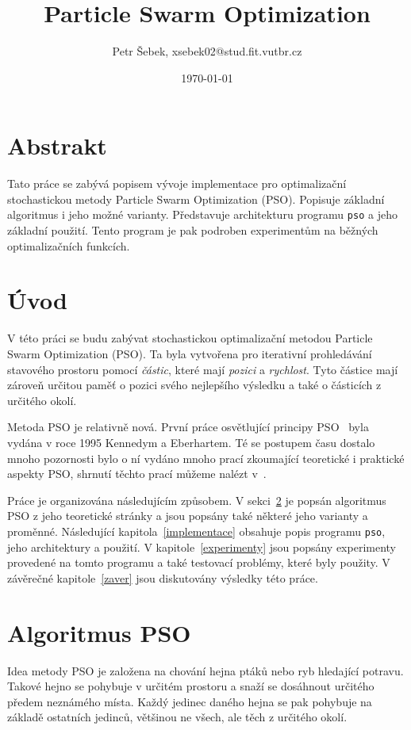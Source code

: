 \documentclass[12pt,a4paper,fleqn]{article}
\title{Particle Swarm Optimization}
\author{Petr Šebek, xsebek02@stud.fit.vutbr.cz}
\date{\today}
\begin{document}
\maketitle

\section*{Abstrakt}
Tato práce se zabývá popisem vývoje implementace pro optimalizační stochastickou metody Particle Swarm Optimization (PSO). Popisuje základní algoritmus i jeho možné varianty. Představuje architekturu programu \texttt{pso} a jeho základní použití. Tento program je pak podroben experimentům na běžných optimalizačních funkcích.


\section{Úvod}
V této práci se budu zabývat stochastickou optimalizační metodou Particle Swarm  Optimization (PSO). 
Ta byla vytvořena pro iterativní prohledávání stavového prostoru pomocí \textit{částic}, které mají \textit{pozici} a \textit{rychlost}. Tyto částice mají zároveň určitou paměť o pozici svého nejlepšího výsledku a také o částicích z určitého okolí.

Metoda PSO je relativně nová. První práce osvětlující principy PSO~\cite{eberhat1995particle} byla vydána v roce 1995 Kennedym a Eberhartem. Té se postupem času dostalo mnoho pozornosti bylo o ní vydáno mnoho prací zkoumající teoretické i praktické aspekty PSO, shrnutí těchto prací můžeme nalézt v~\cite{poli2007particle}.

Práce je organizována následujícím způsobem. V sekci~\ref{algoritmus_pso} je popsán algoritmus PSO z jeho teoretické stránky a jsou popsány také některé jeho varianty a proměnné. Následující kapitola~\ref{implementace} obsahuje popis programu \texttt{pso}, jeho architektury a použití. V kapitole~\ref{experimenty} jsou popsány experimenty provedené na tomto programu a také testovací problémy, které byly použity. V závěrečné kapitole~\ref{zaver} jsou diskutovány výsledky této práce.

\section{Algoritmus PSO} \label{algoritmus_pso}
Idea metody PSO je založena na chování hejna ptáků nebo ryb hledající potravu. Takové hejno se pohybuje v určitém prostoru a snaží se dosáhnout určitého předem neznámého místa. Každý jedinec daného hejna se pak pohybuje na základě ostatních jedinců, většinou ne všech, ale těch z určitého okolí.
\end{document}
